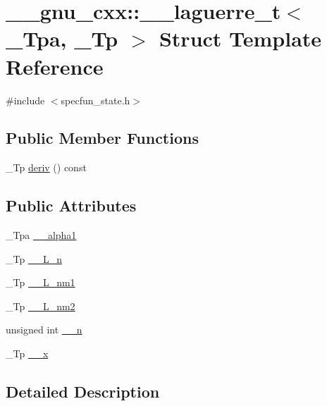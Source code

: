 \hypertarget{struct____gnu__cxx_1_1____laguerre__t}{}\section{\+\_\+\+\_\+gnu\+\_\+cxx\+:\+:\+\_\+\+\_\+laguerre\+\_\+t$<$ \+\_\+\+Tpa, \+\_\+\+Tp $>$ Struct Template Reference}
\label{struct____gnu__cxx_1_1____laguerre__t}


{\ttfamily \#include $<$specfun\+\_\+state.\+h$>$}

\subsection*{Public Member Functions}
\begin{DoxyCompactItemize}
\item 
\+\_\+\+Tp \hyperlink{struct____gnu__cxx_1_1____laguerre__t_aed1a4e46a049188de5ca6c2cc9bc5cdf}{deriv} () const
\end{DoxyCompactItemize}
\subsection*{Public Attributes}
\begin{DoxyCompactItemize}
\item 
\+\_\+\+Tpa \hyperlink{struct____gnu__cxx_1_1____laguerre__t_a8aa1b08deed3b739c3de21953f2c5494}{\+\_\+\+\_\+alpha1}
\item 
\+\_\+\+Tp \hyperlink{struct____gnu__cxx_1_1____laguerre__t_a788683f1d238f34930550685f47d51de}{\+\_\+\+\_\+\+L\+\_\+n}
\item 
\+\_\+\+Tp \hyperlink{struct____gnu__cxx_1_1____laguerre__t_a29f45a9e9d5c11d38edbdae5fc58f23b}{\+\_\+\+\_\+\+L\+\_\+nm1}
\item 
\+\_\+\+Tp \hyperlink{struct____gnu__cxx_1_1____laguerre__t_a30eafa5b438d9561576bf73d1d4fa66d}{\+\_\+\+\_\+\+L\+\_\+nm2}
\item 
unsigned int \hyperlink{struct____gnu__cxx_1_1____laguerre__t_a955e55280d0176d8ab6a30483d9276d4}{\+\_\+\+\_\+n}
\item 
\+\_\+\+Tp \hyperlink{struct____gnu__cxx_1_1____laguerre__t_a20e54c0367109c5d25218938bca406ee}{\+\_\+\+\_\+x}
\end{DoxyCompactItemize}


\subsection{Detailed Description}

